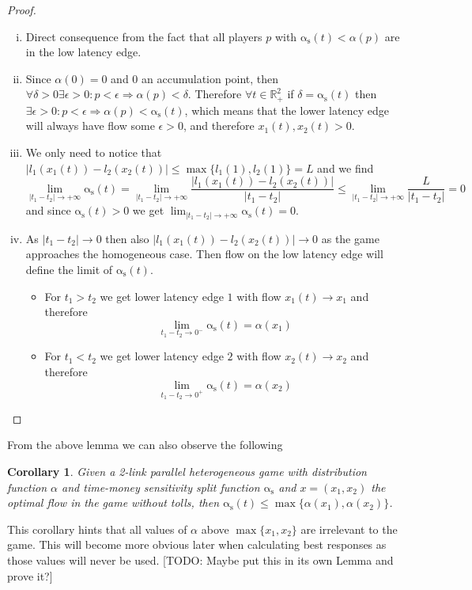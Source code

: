 \documentclass[a4paper,11pt]{article}
\newcommand{\as}{\mathrm{\alpha_s}}
\newcommand{\R}{\mathbb{R}}
\newtheorem{corollary}{Corollary}[section]
\begin{document}
\begin{proof}
	$ $
	\begin{enumerate}[(i)]
		\item Direct consequence from the fact that all players $p$ with $\as(t) < \alpha(p)$ are in the low latency edge.
		\item Since $\alpha(0) = 0$ and $0$ an accumulation point, then $\forall \delta > 0 \exists \epsilon > 0: p < \epsilon \Rightarrow \alpha(p) < \delta$.
		Therefore $\forall t \in \R_+^2$ if $\delta = \as(t)$ then $\exists \epsilon > 0: p < \epsilon \Rightarrow \alpha(p) < \as(t)$, which means that the lower latency edge will always have flow some $\epsilon > 0$, and therefore $x_1(t), x_2(t) > 0$.
		\item We only need to notice that $|l_1(x_1(t)) - l_2(x_2(t))| \le \max\{l_1(1), l_2(1)\} = L$ and we find
		\[\lim_{|t_1 - t_2| \rightarrow +\infty}\as(t) = \lim_{|t_1 - t_2| \rightarrow +\infty}\frac{|l_1(x_1(t)) - l_2(x_2(t))|}{|t_1 - t_2|} \le \lim_{|t_1 - t_2| \rightarrow +\infty}\frac{L}{|t_1 - t_2|} = 0\]
		and since $\as(t) > 0$ we get $\lim_{|t_1 - t_2| \rightarrow +\infty}\as(t) = 0$.
		\item As $|t_1 - t_2| \rightarrow 0$ then also $|l_1(x_1(t)) - l_2(x_2(t))| \rightarrow 0$ as the game approaches the homogeneous case.
		Then flow on the low latency edge will define the limit of $\as(t)$.
			\begin{itemize}
				\item For $t_1 > t_2$ we get lower latency edge $1$ with flow $x_1(t) \rightarrow x_1$ and therefore
				\[\lim_{t_1 - t_2 \rightarrow 0^-} \as(t) = \alpha(x_1)\]
				\item For $t_1 < t_2$ we get lower latency edge $2$ with flow $x_2(t) \rightarrow x_2$ and therefore
				\[\lim_{t_1 - t_2 \rightarrow 0^+} \as(t) = \alpha(x_2)\]
			\end{itemize}
	\end{enumerate}
\end{proof}

From the above lemma we can also observe the following

\begin{corollary}
	Given a 2-link parallel heterogeneous game with distribution function $\alpha$ and time-money sensitivity split function $\as$ and $x = (x_1, x_2)$ the optimal flow in the game without tolls, then $\as(t) \le \max\{\alpha(x_1), \alpha(x_2)\}$.
\end{corollary}

This corollary hints that all values of $\alpha$ above $\max\{x_1, x_2\}$ are irrelevant to the game.
This will become more obvious later when calculating best responses as those values will never be used.
[TODO: Maybe put this in its own Lemma and prove it?]
\end{document}
